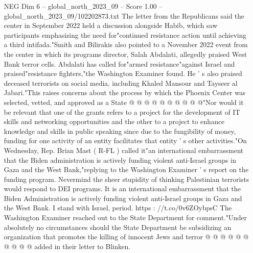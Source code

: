 \begin{textsample}{NEG Dim 6 – global\_north\_2023\_09 – Score 1.00 – global\_north\_2023\_09/102202873.txt}
The letter from the Republicans said the center in September 2022 held a discussion alongside Habib, which saw participants emphasizing the need for"continued resistance action until achieving a third intifada."Smith and Bilirakis also pointed to a November 2022 event from the center in which its programs director, Salah Abdalati, allegedly praised West Bank terror cells.
Abdalati has called for"armed resistance"against Israel and praised"resistance fighters,"the Washington Examiner found.
He ' s also praised deceased terrorists on social media, including Khaled Mansour and Tayseer al Jabari."This raises concerns about the process by which the Phoenix Center was selected, vetted, and approved as a State @ @ @ @ @ @ @ @ @ @"Nor would it be relevant that one of the grants refers to a project for the development of IT skills and networking opportunities and the other to a project to enhance knowledge and skills in public speaking since due to the fungibility of money, funding for one activity of an entity facilitates that entity ' s other activities."On Wednesday, Rep.
Brian Mast ( R-FL ) called it"an international embarrassment that the Biden administration is actively funding violent anti-Israel groups in Gaza and the West Bank,"replying to the Washington Examiner ' s report on the funding program.
Nevermind the sheer stupidity of thinking Palestinian terrorists would respond to DEI programs.
It is an international embarrassment that the Biden Administration is actively funding violent anti-Israel groups in Gaza and the West Bank.
I stand with Israel, period. https : //t.co/0v6ZOybpsC The Washington Examiner reached out to the State Department for comment."Under absolutely no circumstances should the State Department be subsidizing an organization that promotes the killing of innocent Jews and terror @ @ @ @ @ @ @ @ @ @ added in their letter to Blinken.

\end{textsample}
